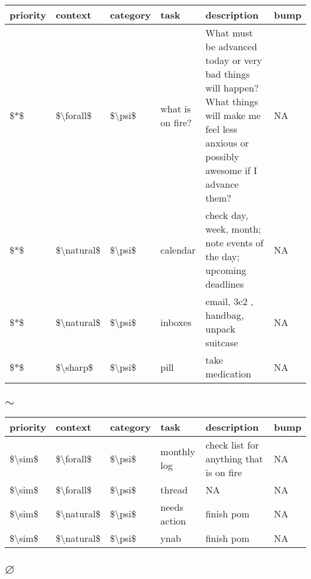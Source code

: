 \documentclass[]{book}
\begin{document}
\begin{tabular}{l|l|l|l|l|l}
\hline
priority & context & category & task & description & bump\\
\hline
\$*\$ & \$\textbackslash{}forall\$ & \$\textbackslash{}psi\$ & what is on fire? & What must be advanced today or very bad things will happen? What things will make me feel less anxious or possibly awesome if I advance them? & NA\\
\hline
\$*\$ & \$\textbackslash{}natural\$ & \$\textbackslash{}psi\$ & calendar & check day, week, month; note events of the day; upcoming deadlines & NA\\
\hline
\$*\$ & \$\textbackslash{}natural\$ & \$\textbackslash{}psi\$ & inboxes & email, 3c2 , handbag, unpack suitcase & NA\\
\hline
\$*\$ & \$\textbackslash{}sharp\$ & \$\textbackslash{}psi\$ & pill & take medication & NA\\
\hline
\end{tabular}

\hypertarget{sim}{%
\subsection{\texorpdfstring{\(\sim\)}{\textbackslash{}sim}}\label{sim}}

\begin{tabular}{l|l|l|l|l|l}
\hline
priority & context & category & task & description & bump\\
\hline
\$\textbackslash{}sim\$ & \$\textbackslash{}forall\$ & \$\textbackslash{}psi\$ & monthly log & check list for anything that is on fire & NA\\
\hline
\$\textbackslash{}sim\$ & \$\textbackslash{}forall\$ & \$\textbackslash{}psi\$ & thread & NA & NA\\
\hline
\$\textbackslash{}sim\$ & \$\textbackslash{}natural\$ & \$\textbackslash{}psi\$ & needs action & finish pom & NA\\
\hline
\$\textbackslash{}sim\$ & \$\textbackslash{}natural\$ & \$\textbackslash{}psi\$ & ynab & finish pom & NA\\
\hline
\end{tabular}

\hypertarget{varnothing}{%
\subsection{\texorpdfstring{\(\varnothing\)}{\textbackslash{}varnothing}}\label{varnothing}}
\end{document}
